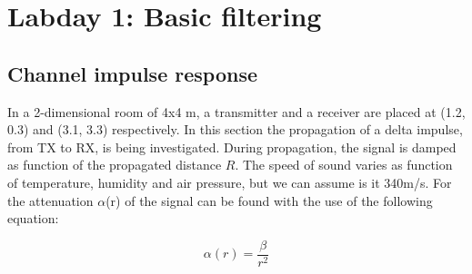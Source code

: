 \documentclass[final]{scrreprt} %
\begin{document}
\chapter{Labday 1: Basic filtering}
\label{ch:labday1}
\section{Channel impulse response}
In a 2-dimensional room of 4x4 m, a transmitter and a receiver are placed at (1.2, 0.3) and (3.1, 3.3) respectively.
In this section the propagation of a delta impulse, from TX to RX, is being investigated.
During propagation, the signal is damped as function of the propagated distance $R$. 
The speed of sound varies as function of temperature, humidity and air pressure, but we can assume is it 340m/s. 
For the attenuation $\alpha$(r) of the signal can be found with the use of the following equation:

\begin{equation}
	\alpha (r) = \frac{\beta}{r^2}
\label{eq:damping}
\end{equation}
\end{document}
